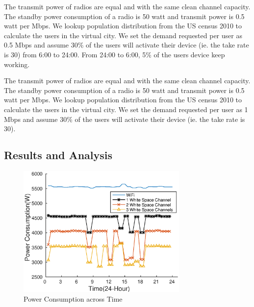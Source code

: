 

The transmit power of radios are equal and with the same clean channel capacity. 
The standby power consumption of a radio is 50 watt and transmit power is 0.5 watt per Mbps.
We lookup population distribution from the US census 2010 to calculate the users in the 
virtual city. We set the demand requested per user as 0.5 Mbps and assume 30\% of the users will 
activate their device (ie. the take rate is 30) from 6:00 to 24:00. From 24:00 to 6:00, 5\% of 
the users device keep working. 



The transmit power of radios are equal and with the same clean channel capacity. 
The standby power consumption of a radio is 50 watt and transmit power is 0.5 watt per Mbps.
We lookup population distribution from the US census 2010 to calculate the users in the 
virtual city. We set the demand requested per user as 1 Mbps and assume 30\% of the users will 
activate their device (ie. the take rate is 30). 














\subsection{Results and Analysis}
\label{subsec:results}




\begin{figure}
\vspace{-0.0in}
\centering
\includegraphics[width=84mm]{figures/timevary}
\vspace{-0.1in}
\caption{Power Consumption across Time}
\label{fig:timevary}
\vspace{-0.1in}
\end{figure}


